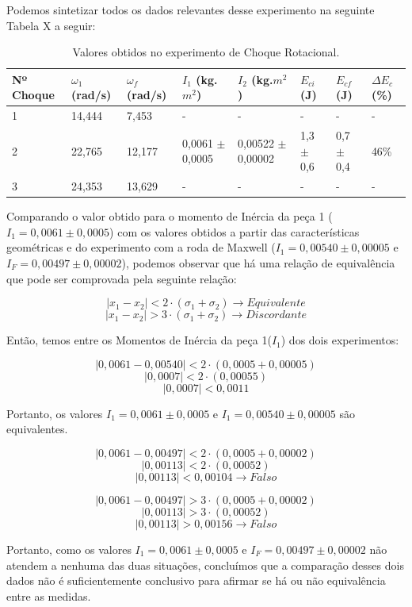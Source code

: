 Podemos sintetizar todos os dados relevantes desse experimento na seguinte Tabela X a seguir: 

\begin{table}[H]
    \centering
    \begin{tabular}{ |M{1.6cm}||M{1.5cm}||M{1.5cm}||M{1.6cm}||M{1.9cm}||M{1.3cm}||M{1.3cm}||M{1cm}|}
        \hline
        \textbf{Nº Choque} & \textbf{$\omega_1$ (rad/s)} & \textbf{$\omega_f$ (rad/s)} & \textbf{$I_1$ (kg.$m^2$)} & \textbf{$I_2$ (kg.$m^2$)} & \textbf{$E_{ci}$ (J)} & \textbf{$E_{cf}$ (J)} & \textbf{$\Delta E_c$ (\%)}\\
         & 14,444 & 7,453 & - & - & - & - & -\\
        2 & 22,765 & 12,177 & 0,0061 $\pm$ 0,0005 & 0,00522 $\pm$ 0,00002 & 1,3 $\pm$ 0,6 & 0,7 $\pm$ 0,4 & 46\%\\
        3 & 24,353 & 13,629 & - & - & - & - & -\\
        \hline
    \end{tabular}
    \caption{Valores obtidos no experimento de Choque Rotacional.}
\end{table}

Comparando o valor obtido para o momento de Inércia da peça 1 ($I_1 = 0,0061 \pm 0,0005$) com os valores obtidos a partir das características geométricas e do experimento com a roda de Maxwell ($I_1 = 0,00540 \pm 0,00005$ e $I_F = 0,00497 \pm 0,00002$), podemos observar que há uma relação de equivalência que pode ser comprovada pela seguinte relação:

\[|x_1 - x_2| < 2 \cdot (\sigma_1 + \sigma_2) \longrightarrow Equivalente\]
\[|x_1 - x_2| > 3 \cdot (\sigma_1 + \sigma_2) \longrightarrow Discordante\]

Então, temos entre os Momentos de Inércia da peça 1($I_1$) dos dois experimentos:

\[|0,0061 - 0,00540| < 2 \cdot (0,0005 + 0,00005)\]
\[|0,0007| < 2 \cdot (0,00055)\]
\[|0,0007| < 0,0011\]

Portanto, os valores $I_1 = 0,0061 \pm 0,0005$ e $I_1 = 0,00540 \pm 0,00005$ são equivalentes.

\[|0,0061 - 0,00497| < 2 \cdot (0,0005 + 0,00002)\]
\[|0,00113| < 2 \cdot (0,00052)\]
\[|0,00113| < 0,00104 \longrightarrow Falso\]

\[|0,0061 - 0,00497| > 3 \cdot (0,0005 + 0,00002)\]
\[|0,00113| > 3 \cdot (0,00052)\]
\[|0,00113| > 0,00156 \longrightarrow Falso\]

Portanto, como os valores $I_1 = 0,0061 \pm 0,0005$ e $I_F = 0,00497 \pm 0,00002$ não atendem a nenhuma das duas situações, concluímos que a comparação desses dois dados não é suficientemente conclusivo para afirmar se há ou não equivalência entre as medidas.

